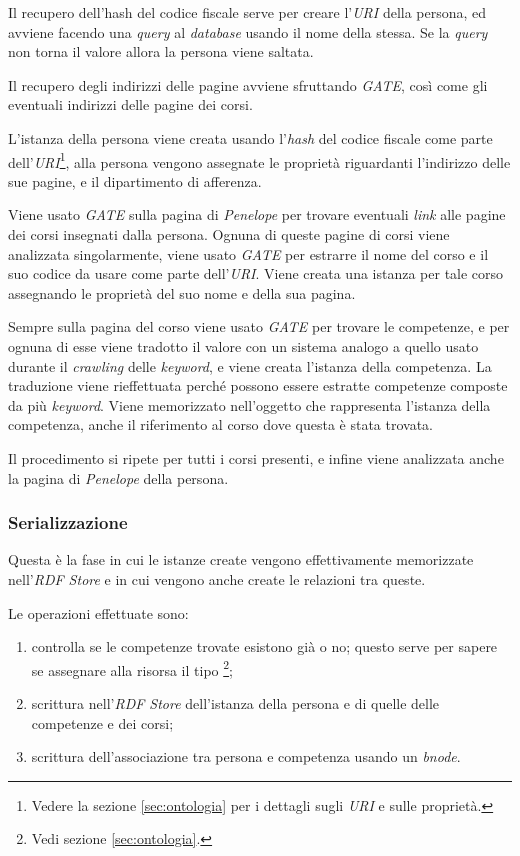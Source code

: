 \documentclass[tesi.tex]{subfiles}
\begin{document}
Il recupero dell'hash del codice fiscale serve per creare l'\emph{URI}
della persona, ed avviene facendo una \emph{query} al \emph{database}
usando il nome della stessa. Se la \emph{query} non torna il valore allora la
persona viene saltata.

Il recupero degli indirizzi delle pagine avviene sfruttando
\emph{GATE}, cos\`i come gli eventuali indirizzi delle pagine dei
corsi.

L'istanza della persona viene creata usando l'\emph{hash} del codice
fiscale come parte dell'\emph{URI}\footnote{Vedere la sezione
  \ref{sec:ontologia} per i dettagli sugli \emph{URI} e sulle
  propriet\`a.}, alla persona vengono assegnate le propriet\`a
riguardanti l'indirizzo delle sue pagine, e il dipartimento di
afferenza.

Viene usato \emph{GATE} sulla pagina di \emph{Penelope} per trovare
eventuali \emph{link} alle pagine dei corsi insegnati dalla
persona. Ognuna di queste pagine di corsi viene analizzata
singolarmente, viene usato \emph{GATE} per estrarre il nome del corso
e il suo codice da usare come parte dell'\emph{URI}. Viene creata una
istanza per tale corso assegnando le propriet\`a del suo nome e della
sua pagina.

Sempre sulla pagina del corso viene usato \emph{GATE} per trovare le
competenze, e per ognuna di esse viene tradotto il valore con un
sistema analogo a quello usato durante il \emph{crawling} delle
\emph{keyword}, e viene creata l'istanza della competenza. La
traduzione viene rieffettuata perch\'e possono essere estratte
competenze composte da pi\`u \emph{keyword}. Viene memorizzato nell'oggetto che
rappresenta l'istanza della competenza, anche il riferimento al corso
dove questa \`e stata trovata.

Il procedimento si ripete per tutti i corsi presenti, e infine viene
analizzata anche la pagina di \emph{Penelope} della
persona.

\subsubsection{Serializzazione}
Questa \`e la fase in cui le istanze create vengono effettivamente
memorizzate nell'\emph{RDF Store} e in cui vengono anche create le
relazioni tra queste.

Le operazioni effettuate sono:
\begin{enumerate}
\item controlla se le competenze trovate esistono gi\`a o no;
  questo serve per sapere se assegnare alla risorsa il tipo
  \footnote{Vedi sezione
    \ref{sec:ontologia}.};
\item scrittura nell'\emph{RDF Store} dell'istanza della persona e
  di quelle delle competenze e dei corsi;
\item scrittura dell'associazione tra persona e competenza usando un
  \emph{bnode}.
\end{enumerate}
\end{document}
